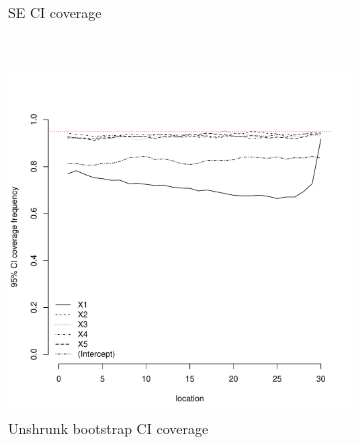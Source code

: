 \documentclass[authoryear, review, 11pt]{elsarticle}
\begin{document}
\begin{figure}
\begin{subfigure}[b]{0.45\textwidth}
		\caption{SE CI coverage}
	\end{subfigure}%
	\\%
	\begin{subfigure}[b]{0.45\textwidth}
	\centering
		\includegraphics[width=\textwidth]{../../figures/simulation/15.22.profile_unshrunk_bootstrap_coverage.pdf}
		\caption{Unshrunk bootstrap CI coverage}
	\end{subfigure}%
	~ %
	\begin{subfigure}[b]{0.45\textwidth}
	\centering

\end{subfigure}
\end{figure}
\end{document}

